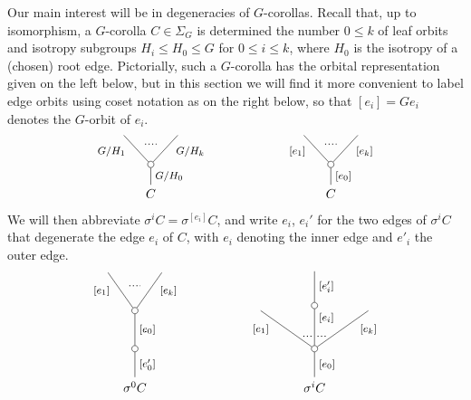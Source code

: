\documentclass[a4paper,10pt
,draft
]{article}%
\numberwithin{equation}{section}
\numberwithin{figure}{section}
\theoremstyle{definition} %
\newcommand{\1}{\ensuremath{\mathbbm 1}}%
\begin{document}
Our main interest will be in degeneracies of $G$-corollas. Recall that, up to isomorphism, 
a $G$-corolla $C \in \Sigma_G$ is determined the number $0 \leq k$ of leaf orbits
and isotropy subgroups
$H_i \leq H_0 \leq G$ for $0 \leq i \leq k$,
where $H_0$ is the isotropy of a (chosen) root edge.
Pictorially, such a $G$-corolla has the orbital representation given on the left below,
but in this section we will find it more convenient to label edge orbits using coset notation as on the right below,
so that $[e_i] = G e_i$ denotes the $G$-orbit of $e_i$.
\[
\begin{tikzpicture}
[grow=up,auto,level distance=2.3em,every node/.style = {font=\footnotesize},dummy/.style={circle,draw,inner sep=0pt,minimum size=1.75mm}]
	\node at (0,0) [font=\normalsize]{$C$}
		child{node [dummy] {}
			child{
			edge from parent node [swap,near end] {$G/H_k$} node [name=Kn] {}}
			child{
			edge from parent node [near end] {$G/H_1$}
node [name=Kone,swap] {}}
		edge from parent node [swap] {$G/H_0$}
		};
		\draw [dotted,thick] (Kone) -- (Kn) ;
	\node at (5,0) [font=\normalsize]{$C$}
		child{node [dummy] {}
			child{
			edge from parent node [swap,near end] {$[e_k]$} node [name=Kn] {}}
			child{
			edge from parent node [near end] {$[e_1]$}
node [name=Kone,swap] {}}
		edge from parent node [swap] {$[e_0]$}
		};
		\draw [dotted,thick] (Kone) -- (Kn) ;
\end{tikzpicture}
\]
We will then abbreviate $\sigma^i C = \sigma^{[e_i]} C$, and write $e_i$, $e_i'$ for the two edges of $\sigma^i C $ that degenerate the edge $e_i$ of $C$,
with $e_i$ denoting the inner edge and $e'_i$ the outer
edge.
\[
\begin{tikzpicture}
[grow=up,auto,level distance=3em,
every node/.style = {font=\footnotesize},
dummy/.style={circle,draw,inner sep=0pt,minimum size=1.75mm}]
	\node at (0,0) [font=\normalsize]{$\sigma^0 C$}
		child{node [dummy] {}
			child{node [dummy] {}
				child{
				edge from parent node [swap,near end] {$[e_k]$} node [name=Kn] {}}
				child{
				edge from parent node [near end] {$[e_1]$}
node [name=Kone,swap] {}}
			edge from parent node [swap] {$[e_0]$}}
		edge from parent node [swap] {$[e'_0]$}
		};
		\draw [dotted,thick] (Kone) -- (Kn) ;
	\node at (5,0) [font=\normalsize]{$\sigma^i C$}
		child{node [dummy] {}
			child{
			edge from parent node [swap,near end] {$[e_k]$} node [near start,inner sep=1pt,name=Kn] {}}
			child[level distance=3.4em]{node [dummy] {}
				child[level distance=2.7em]{
				edge from parent node [swap] {$[e'_i]$}
}
			edge from parent node [near end,swap] {$[e_i]$}
node [near start,inner sep=1pt,name=Kone,swap] {}
node [near start,inner sep=1pt,name=Kone1] {}}
			child{
			edge from parent node [near end] {$[e_1]$}
node [swap] {}
node [near start,inner sep=1pt,name=Kn1,swap]{}}
		edge from parent node [swap] {$[e_0]$}
		};
		\draw [dotted,thick] (Kone) -- (Kn) ;
		\draw [dotted,thick] (Kone1) -- (Kn1) ;
\end{tikzpicture}
\]
\end{document}
